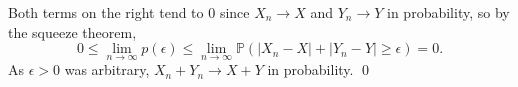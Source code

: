 \documentclass[12pt]{article}
\begin{document}
\begin{enumerate}
    Both terms on the right tend to $0$ since $X_n \to X$ and $Y_n \to Y$ in probability, so by the squeeze theorem,
    $$
    0 \leq \lim_{n \to \infty} p(\epsilon) \leq \lim_{n \to \infty} \mathbb P(|X_n - X| + |Y_n - Y| \geq \epsilon) = 0.
    $$
    As $\epsilon > 0$ was arbitrary, $X_n + Y_n \to X + Y$ in probability. \qed
\end{enumerate}
\end{document}

